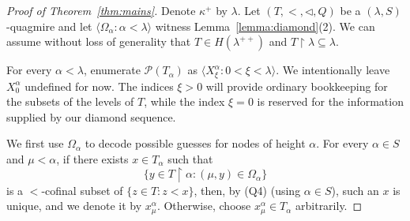 \documentclass[]{amsart}
\theoremstyle{definition}
\theoremstyle{remark}
\begin{document}
\begin{proof}[Proof of Theorem~\ref{thm:mains}]
Denote $\kappa^+$ by $\lambda$. Let $(T, <, \lhd, Q)$ be a $(\lambda, S)$-quagmire and let $\langle \Omega_\alpha : \alpha < \lambda\rangle$ witness Lemma~\ref{lemma:diamond}(2). We can assume without loss of generality that $T \in H(\lambda^{++})$ and $T \upharpoonright \lambda \subseteq \lambda$. 

For every $\alpha < \lambda$, enumerate $\mathcal{P}(T_\alpha)$ as $\langle X^\alpha_\xi : 0 < \xi < \lambda\rangle$. We intentionally leave $X^\alpha_0$ undefined for now. The indices $\xi > 0$ will provide ordinary bookkeeping for the subsets of the levels of $T$, while the index $\xi = 0$ is reserved for the information supplied by our diamond sequence.
 
We first use $\Omega_\alpha$ to decode possible guesses for nodes of height $\alpha$. For every $\alpha \in S$ and $\mu < \alpha$, if there exists $x \in T_\alpha$ such that
\[
\big\{y \in T \upharpoonright \alpha : (\mu, y) \in \Omega_\alpha\}
\]
 is a $<$-cofinal subset of $\{z \in T : z < x\}$, then, by (Q4) (using $\alpha \in S$), such an $x$ is unique, and we denote it by $x_\mu^\alpha$. Otherwise, choose $x_\mu^\alpha \in T_\alpha$ arbitrarily.



\end{proof}
\end{document}
